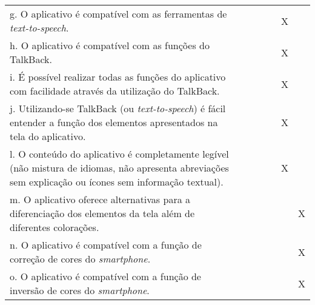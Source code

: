 \documentclass[portuguese,oneside]{tcc}
\begin{document}
\begin{center}
\begin{longtabu}{|L{25em}|c|c|c|c|c|c|}
								g. O aplicativo é compatível com as ferramentas de \emph{text-to-speech}. & & & & & X & \\ 
								h. O aplicativo é compatível com as funções do TalkBack. & & & & & X & \\ 
								i. É possível realizar todas as funções do aplicativo com facilidade através da utilização do TalkBack.	& & & & & X & \\ 
								j. Utilizando-se TalkBack (ou \emph{text-to-speech}) é fácil entender a função dos elementos apresentados na tela do aplicativo. & & & & & X & \\ 
								l. O conteúdo do aplicativo é completamente legível (não mistura de idiomas, não apresenta abreviações sem explicação ou ícones sem informação textual). & & & & & X & \\ 
								m. O aplicativo oferece alternativas para a diferenciação dos elementos da tela além de diferentes colorações. & & & & & & X \\ 
								n. O aplicativo é compatível com a função de correção de cores do \emph{smartphone}. & & & & & & X \\ 
								o. O aplicativo é compatível com a função de inversão de cores do \emph{smartphone}. & & & & & & X \\ 
							\end{longtabu}
						\end{center}
						
\end{document}
